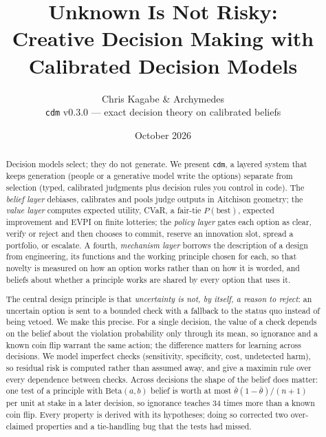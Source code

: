 \documentclass[11pt]{article}
\title{\textbf{Unknown Is Not Risky:\\Creative Decision Making with Calibrated Decision Models}}
\author{Chris Kagabe \& Archymedes \\[6pt]
\small \texttt{cdm} v0.3.0 --- exact decision theory on calibrated beliefs}
\date{October 2026}
\theoremstyle{definition}
\begin{document}
\maketitle

\begin{abstract}
Decision models select; they do not generate. We present \texttt{cdm}, a layered system that
keeps generation (people or a generative model write the options) separate from selection
(typed, calibrated judgments plus decision rules you control in code). The \emph{belief layer}
debiases, calibrates and pools judge outputs in Aitchison geometry; the \emph{value layer}
computes expected utility, CVaR, a fair-tie $P(\mathrm{best})$, expected improvement and EVPI on
finite lotteries; the \emph{policy layer} gates each option as clear, verify or reject and then
chooses to commit, reserve an innovation slot, spread a portfolio, or escalate. A fourth,
\emph{mechanism layer} borrows the description of a design from engineering, its functions and
the working principle chosen for each, so that novelty is measured on how an option works rather
than on how it is worded, and beliefs about whether a principle works are shared by every option
that uses it.

The central design principle is that \emph{uncertainty is not, by itself, a reason to reject}:
an uncertain option is sent to a bounded check with a fallback to the status quo instead of being
vetoed. We make this precise. For a single decision, the value of a check depends on the belief
about the violation probability only through its mean, so ignorance and a known coin flip warrant
the same action; the difference matters for learning across decisions. We model imperfect checks
(sensitivity, specificity, cost, undetected harm), so residual risk is computed rather than assumed
away, and give a maximin rule over every dependence between checks. Across decisions the shape of
the belief does matter: one test of a principle with $\mathrm{Beta}(a,b)$ belief is worth at most
$\bar\theta(1-\bar\theta)/(n+1)$ per unit at stake in a later decision, so ignorance teaches 34
times more than a known coin flip. Every property is derived with
its hypotheses; doing so corrected two over-claimed properties and a tie-handling bug that the
tests had missed.


\end{abstract}
\end{document}
